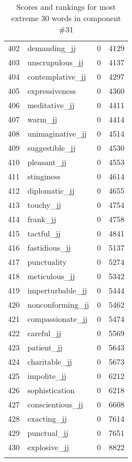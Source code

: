 \begin{longtable}[!htbp]{| rlr@{.}l |}
    402 & demanding\_jj & 0 & 4129 \\
    403 & unscrupulous\_jj & 0 & 4137 \\
    404 & contemplative\_jj & 0 & 4297 \\
    405 & expressiveness & 0 & 4360 \\
    406 & meditative\_jj & 0 & 4411 \\
    407 & warm\_jj & 0 & 4414 \\
    408 & unimaginative\_jj & 0 & 4514 \\
    409 & suggestible\_jj & 0 & 4530 \\
    410 & pleasant\_jj & 0 & 4553 \\
    411 & stinginess & 0 & 4614 \\
    412 & diplomatic\_jj & 0 & 4655 \\
    413 & touchy\_jj & 0 & 4754 \\
    414 & frank\_jj & 0 & 4758 \\
    415 & tactful\_jj & 0 & 4841 \\
    416 & fastidious\_jj & 0 & 5137 \\
    417 & punctuality & 0 & 5274 \\
    418 & meticulous\_jj & 0 & 5342 \\
    419 & imperturbable\_jj & 0 & 5444 \\
    420 & nonconforming\_jj & 0 & 5462 \\
    421 & compassionate\_jj & 0 & 5474 \\
    422 & careful\_jj & 0 & 5569 \\
    423 & patient\_jj & 0 & 5643 \\
    424 & charitable\_jj & 0 & 5673 \\
    425 & impolite\_jj & 0 & 6212 \\
    426 & sophistication & 0 & 6218 \\
    427 & conscientious\_jj & 0 & 6608 \\
    428 & exacting\_jj & 0 & 7614 \\
    429 & punctual\_jj & 0 & 7651 \\
    430 & explosive\_jj & 0 & 8822 \\
    \hline
    \caption{Scores and rankings for most extreme 30 words in component \#31} \\
\end{longtable}
